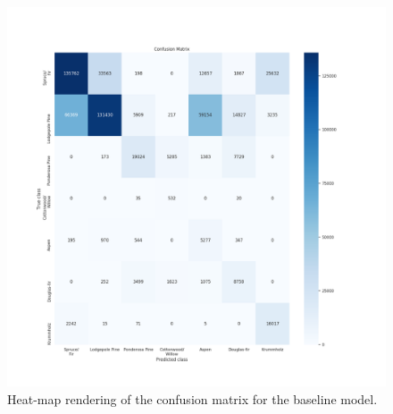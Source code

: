 \begin{figure}
\centering
\includegraphics[width=\textwidth]{./TeX_files/img/baselineconfmatheatmap.png}
\caption{Heat-map rendering of the confusion matrix for the baseline model.}
\label{fig:baselineconfmatheatmap}
\end{figure}
\begin{table}
\centering
{}
\caption{Precision, recall, f1-score summary table for the baseline model. Support indicates the number of occurrences of each particular class in the true responses (for the test set). Weighted avg is the per metric weighted average where the weights correspond to the support of that class.}
\label{tab:baselineclassificationrep}
\end{table}
